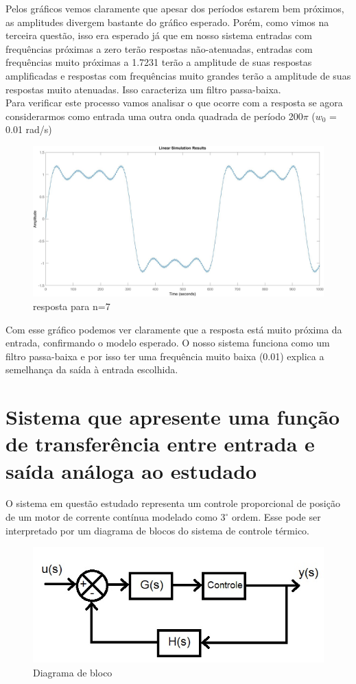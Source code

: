 \documentclass[a4paper,12pt,twoside]{article}
\begin{document}
Pelos gráficos vemos claramente que apesar dos períodos estarem bem próximos, as amplitudes divergem bastante do gráfico esperado. Porém, como vimos na terceira questão, isso era esperado já que em nosso sistema entradas com frequências próximas a zero terão respostas não-atenuadas, entradas com frequências muito próximas a 1.7231 terão a amplitude de suas respostas amplificadas e respostas com frequências muito grandes terão a amplitude de suas respostas muito atenuadas. Isso caracteriza um filtro passa-baixa.\\
\indent Para verificar este processo vamos analisar o que ocorre com a resposta se agora considerarmos como entrada uma outra onda quadrada de período 200$\pi$ ($w_{0}$ = 0.01 rad/s)
\begin{figure}[H]
\centering
\includegraphics[scale=0.23]{w001n7a12.jpg}
\caption{resposta para n=7}
\label{fig:n=7 e curva original}
\end{figure}
Com esse gráfico podemos ver claramente que a resposta está muito próxima da entrada, confirmando o modelo esperado. O nosso sistema funciona como um filtro passa-baixa  e por isso ter uma frequência muito baixa (0.01) explica a semelhança da saída à entrada escolhida.

\section{Sistema que apresente uma função de transferência entre entrada e saída análoga ao estudado}
O sistema em questão estudado representa um controle proporcional de posição de um motor de corrente contínua modelado como $3^{\circ}$ ordem. Esse pode ser interpretado por um diagrama de blocos do sistema de controle térmico.

\begin{figure}[H]
\centering
\includegraphics[scale=0.7]{diagrama.jpg}
\caption{Diagrama de bloco}
\label{fig:diagrama}
\end{figure}
\end{document}
